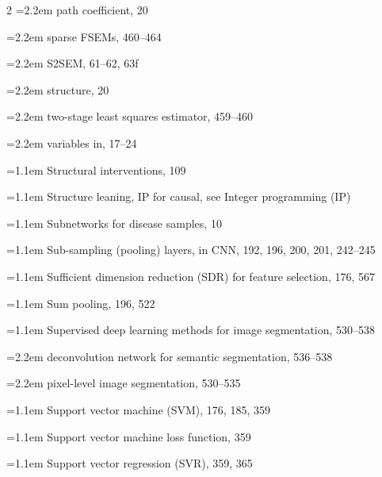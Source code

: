 \begin{multicols}{2}
\noindent\hangindent=2.2em \hspace*{1.1em}path coefficient, 20\par
\noindent\hangindent=2.2em \hspace*{1.1em}sparse FSEMs, 460--464\par
\noindent\hangindent=2.2em \hspace*{1.1em}S2SEM, 61--62, 63f\par
\noindent\hangindent=2.2em \hspace*{1.1em}structure, 20\par
\noindent\hangindent=2.2em \hspace*{1.1em}two-stage least squares estimator, 459--460\par
\noindent\hangindent=2.2em \hspace*{1.1em}variables in, 17--24\par
\noindent\hangindent=1.1em Structural interventions, 109\par
\noindent\hangindent=1.1em Structure leaning, IP for causal, see Integer programming (IP)\par
\noindent\hangindent=1.1em Subnetworks for disease samples, 10\par
\noindent\hangindent=1.1em Sub-sampling (pooling) layers, in CNN, 192, 196, 200, 201, 242--245\par
\noindent\hangindent=1.1em Sufficient dimension reduction (SDR) for feature selection, 176, 567\par
\noindent\hangindent=1.1em Sum pooling, 196, 522\par
\noindent\hangindent=1.1em Supervised deep learning methods for image segmentation, 530--538\par
\noindent\hangindent=2.2em \hspace*{1.1em}deconvolution network for semantic segmentation, 536--538\par
\noindent\hangindent=2.2em \hspace*{1.1em}pixel-level image segmentation, 530--535\par
\noindent\hangindent=1.1em Support vector machine (SVM), 176, 185, 359\par
\noindent\hangindent=1.1em Support vector machine loss function, 359\par
\noindent\hangindent=1.1em Support vector regression (SVR), 359, 365\par


\end{multicols}
